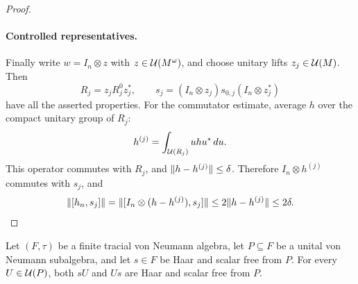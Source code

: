 \begin{proof}
\paragraph{Controlled representatives.}
Finally write $w=I_n\otimes z$ with $z\in\mathcal U(M^\omega)$, and
choose unitary lifts $z_j\in\mathcal U(M)$.  Then
\[
 R_j=z_jR_j^0z_j^*,\qquad
 s_j=(I_n\otimes z_j)s_{0,j}(I_n\otimes z_j^*)
\]
have all the asserted properties.  For the commutator estimate,
average $h$ over the compact unitary group of $R_j$:
\[
 h^{(j)}=\int_{\mathcal U(R_j)}u h u^*\,du.
\]
This operator commutes with $R_j$, and
$\lVert h-h^{(j)}\rVert\leq\delta$.  Therefore
$I_n\otimes h^{(j)}$ commutes with $s_j$, and
\[
 \lVert[h_n,s_j]\rVert
 =\lVert[I_n\otimes(h-h^{(j)}),s_j]\rVert
 \leq2\lVert h-h^{(j)}\rVert\leq2\delta.
\]
\end{proof}

\begin{lemma}
\label{lem:haar-twist}
Let $(F,\tau)$ be a finite tracial von Neumann algebra, let
$P\subseteq F$ be a unital von Neumann subalgebra, and let $s\in F$
be Haar and scalar free from $P$.  For every $U\in\mathcal U(P)$, both
$sU$ and $Us$ are Haar and scalar free from $P$.
\end{lemma}

